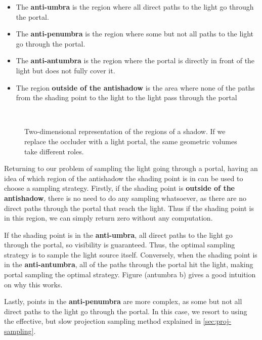 \begin{itemize}
  \item The \textbf{anti-umbra} is the region where all direct paths to the light go through the portal.
  \item The \textbf{anti-penumbra} is the region where some but not all paths to the light go through the portal.
  \item The \textbf{anti-antumbra} is the region where the portal is directly in front of the light but does not fully cover it.
  \item The region \textbf{outside of the antishadow} is the area where none of the paths from the shading point to the light to the light pass through the portal
\end{itemize}

\begin{figure}[H]
  \centering
  \\
  \label{fig:antishadow}
  \caption{Two-dimensional representation of the regions of a shadow. If we replace the occluder with a light portal, the same geometric volumes take different roles.}
\end{figure}

Returning to our problem of sampling the light going through a portal, having an idea of which region of the antishadow the shading point is in can be used to choose a sampling strategy. Firstly, if the shading point is  \textbf{outside of the antishadow}, there is no need to do any sampling whatsoever, as there are no direct paths through the portal that reach the light. Thus if the shading point is in this region, we can simply return zero without any computation.

If the shading point is in the \textbf{anti-umbra}, all direct paths to the light go through the portal, so visibility is guaranteed. Thus, the optimal sampling strategy is to sample the light source itself. Conversely, when the shading point is in the \textbf{anti-antumbra}, all of the paths through the portal hit the light, making portal sampling the optimal strategy. Figure (antumbra b) gives a good intuition on why this works.

Lastly, points in the \textbf{anti-penumbra} are more complex, as some but not all direct paths to the light go through the portal. In this case, we resort to using the effective, but slow projection sampling method explained in \autoref{sec:proj-sampling}. 

